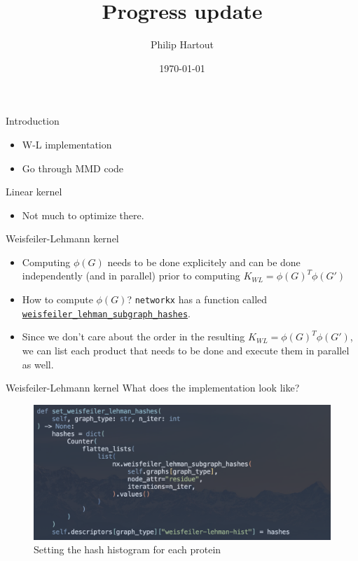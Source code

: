 \documentclass[aspectratio=169, 10pt, dvipsnames, handout]{beamer}
\title{Progress update}
\date{\today}
\author{Philip Hartout}
\begin{document}
\maketitle

\begin{frame}[fragile]{Introduction}


  \begin{itemize}
  \item W-L implementation
  \item Go through MMD code
  \end{itemize}
\end{frame}

\begin{frame}[fragile]{Linear kernel}
  \begin{itemize}
  \item Not much to optimize there.
  \end{itemize}
\end{frame}


\begin{frame}[fragile]{Weisfeiler-Lehmann kernel}
  \begin{itemize}
  \item Computing $\phi(G)$ needs to be done explicitely and can be done
    independently (and in parallel) prior to computing $K_{WL}=\phi(G)^T\phi(G')$
  \item How to compute $\phi(G)$? \texttt{networkx} has a function called
    \href{https://networkx.org/documentation/stable/reference/algorithms/generated/networkx.algorithms.graph_hashing.weisfeiler_lehman_subgraph_hashes.html?highlight=weisfeiler_lehman_subgraph_hashes#networkx.algorithms.graph_hashing.weisfeiler_lehman_subgraph_hashes}{\texttt{weisfeiler\_lehman\_subgraph\_hashes}}.
  \item Since we don't care about the order in the resulting
    $K_{WL}=\phi(G)^T\phi(G')$, we can list each product that needs to be done
    and execute them in parallel as well.
  \end{itemize}
\end{frame}


\begin{frame}[fragile]{Weisfeiler-Lehmann kernel}
  What does the implementation look like?
  \begin{figure}
    \centering
    \includegraphics[width=.6\textwidth]{figures/setting_hash.png}
    \caption{Setting the hash histogram for each protein}
    \label{fig:hash_setting}
  \end{figure}
\end{frame}
\end{document}
